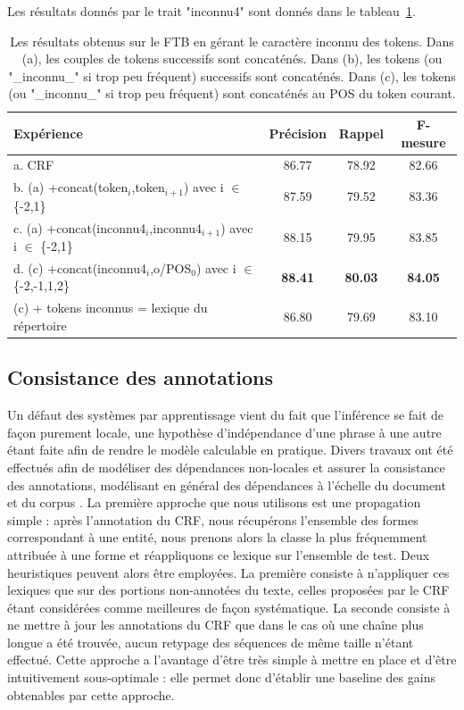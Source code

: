 \documentclass[12pt,a4paper,times,twoside,openright]{report}
\begin{document}
Les résultats donnés par le trait "inconnu4" sont donnés dans le tableau\ \ref{tab:results-ftb-word-bigrams}.

\begin{table}[ht!]
\centering
\begin{tabular}{|l|ccc|}
\hline
Expérience   & Précision & Rappel & F-mesure \\
\hline
a. CRF                                                             & 86.77 & 78.92 & 82.66 \\
b. (a) +concat(token$_{i}$,token$_{i+1}$) avec i $\in$ \{-2,1\}        & 87.59 & 79.52 & 83.36 \\
c. (a) +concat(inconnu4$_{i}$,inconnu4$_{i+1}$) avec i $\in$ \{-2,1\}    & 88.15 & 79.95 & 83.85 \\
d. (c) +concat(inconnu4$_{i}$,o/POS$_{0}$) avec i $\in$ \{-2,-1,1,2\} & \textbf{88.41} & \textbf{80.03} & \textbf{84.05} \\
\hline
(c) + tokens inconnus = lexique du répertoire & 86.80 & 79.69 & 83.10 \\
\hline
\end{tabular}
\caption{Les résultats obtenus sur le FTB en gérant le caractère inconnu des tokens. Dans (a), les couples de tokens successifs sont concaténés. Dans (b), les tokens (ou "\_inconnu\_" si trop peu fréquent) successifs sont concaténés. Dans (c), les tokens (ou "\_inconnu\_" si trop peu fréquent) sont concaténés au POS du token courant.}
\label{tab:results-ftb-word-bigrams}
\end{table}





        \subsection{Consistance des annotations}
        \label{subsec:taxonomy-ftb-consistency}
Un défaut des systèmes par apprentissage vient du fait que l'inférence se fait de façon purement locale, une hypothèse d'indépendance d'une phrase à une autre étant faite afin de rendre le modèle calculable en pratique. Divers travaux ont été effectués afin de modéliser des dépendances non-locales et assurer la consistance des annotations, modélisant en général des dépendances à l'échelle du document et du corpus \citep{krishnan2006effective,ratinov2009design}. La première approche que nous utilisons est une propagation simple : après l'annotation du CRF, nous récupérons l'ensemble des formes correspondant à une entité, nous prenons alors la classe la plus fréquemment attribuée à une forme et réappliquons ce lexique sur l'ensemble de test. Deux heuristiques peuvent alors être employées. La première consiste à n'appliquer ces lexiques que sur des portions non-annotées du texte, celles proposées par le CRF étant considérées comme meilleures de façon systématique. La seconde consiste à ne mettre à jour les annotations du CRF que dans le cas où une chaîne plus longue a été trouvée, aucun retypage des séquences de même taille n'étant effectué. Cette approche a l'avantage d'être très simple à mettre en place et d'être intuitivement sous-optimale : elle permet donc d'établir une baseline des gains obtenables par cette approche.
\end{document}
